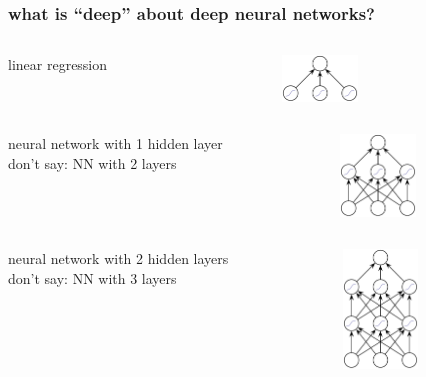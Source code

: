 \documentclass[USenglish,pdftex,compress,10pt,svgnamesi,handout]{beamer}
\begin{document}
\begin{frame}
    \frametitle{what is ``deep'' about deep neural networks?}
    \begin{columns}
    \begin{column}{6cm}
    linear regression
    \end{column}
    \begin{column}{6cm}
     \includegraphics[width=2cm]{pics/nn0l}
    \end{column}
    \end{columns}   
    
     \begin{columns}
    \begin{column}{6cm}
    neural network with 1 hidden layer\\
    don't say: NN with 2 layers
    \end{column}
    \begin{column}{6cm}
     \includegraphics[width=2cm]{pics/nn1l}
    \end{column}
    \end{columns}    
    
    \begin{columns}
    \begin{column}{6cm}
    neural network with 2 hidden layers\\
    don't say: NN with 3 layers
    \end{column}
    \begin{column}{6cm}
     \includegraphics[width=2cm]{pics/nn2l}
    \end{column}
    \end{columns}
    
\end{frame}
\end{document}
